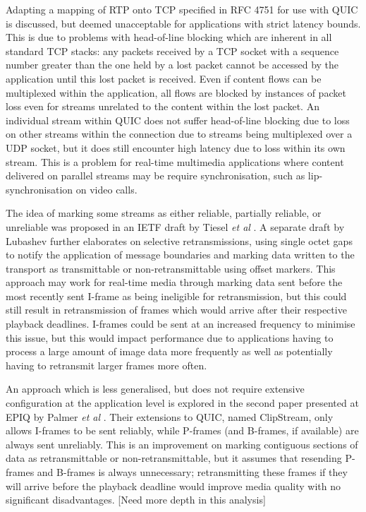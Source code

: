 \documentclass{mprop}
\begin{document}
Adapting a mapping of RTP onto TCP specified in RFC 4751 \cite{RTP-TCP-RFC} for use with QUIC is discussed, but deemed unacceptable for applications with strict latency bounds. This is due to problems with head-of-line blocking which are inherent in all standard TCP stacks: any packets received by a TCP socket with a sequence number greater than the one held by a lost packet cannot be accessed by the application until this lost packet is received. Even if content flows can be multiplexed within the application, all flows are blocked by instances of packet loss even for streams unrelated to the content within the lost packet. An individual stream within QUIC does not suffer head-of-line blocking due to loss on other streams within the connection due to streams being multiplexed over a UDP socket, but it does still encounter high latency due to loss within its own stream. This is a problem for real-time multimedia applications where content delivered on parallel streams may be require synchronisation, such as lip-synchronisation on video calls.


The idea of marking some streams as either reliable, partially reliable, or unreliable was proposed in an IETF draft by Tiesel \textit{et al} \cite{Tiesel2017}. A separate draft by Lubashev \cite{Lubashev2018} further elaborates on selective retransmissions, using single octet gaps to notify the application of message boundaries and marking data written to the transport as transmittable or non-retransmittable using offset markers. This approach may work for real-time media through marking data sent before the most recently sent I-frame as being ineligible for retransmission, but this could still result in retransmission of frames which would arrive after their respective playback deadlines. I-frames could be sent at an increased frequency to minimise this issue, but this would impact performance due to applications having to process a large amount of image data more frequently as well as potentially having to retransmit larger frames more often.

An approach which is less generalised, but does not require extensive configuration at the application level is explored in the second paper presented at EPIQ by Palmer \textit{et al} \cite{Palmer2018}. Their extensions to QUIC, named ClipStream, only allows I-frames to be sent reliably, while P-frames (and B-frames, if available) are always sent unreliably. This is an improvement on marking contiguous sections of data as retransmittable or non-retransmittable, but it assumes that resending P-frames and B-frames is always unnecessary; retransmitting these frames if they will arrive before the playback deadline would improve media quality with no significant disadvantages. [Need more depth in this analysis]
\end{document}
